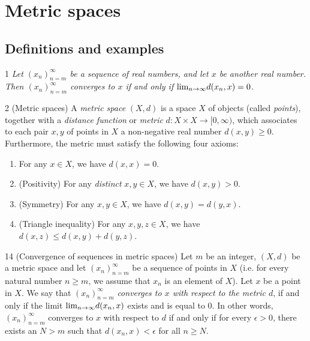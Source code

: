 \section{Metric spaces}\label{a2-ch1}
\subsection{Definitions and examples}
\begin{lemma}{1}
    \label{real-convergence-via-distance}
    \emph{Let $(x_n)_{n=m}^{\infty}$ be a sequence of real numbers, and let $x$
    be another real number. Then $(x_n)_{n=m}^{\infty}$ converges to $x$ if and
    only if $\text{lim}_{n \rightarrow \infty}{d(x_n, x)} = 0$.}
\end{lemma}

\begin{definition}{2}
    \label{metric-space}
    (Metric spaces) A \emph{metric space} $(X, d)$ is a space $X$ of objects
    (called \emph{points}), together with a \emph{distance function} or \emph{metric}
    $d: X \times X \rightarrow [0, \infty)$, which associates to each pair $x, y$
    of points in $X$ a non-negative real number $d(x, y) \geq 0$. Furthermore, the
    metric must satisfy the following four axioms:
    \begin{enumerate}
        \item For any $x \in X$, we have $d(x, x) = 0$.
        \item (Positivity) For any \emph{distinct} $x, y \in X$, we have $d(x, y) > 0$.
        \item (Symmetry) For any $x, y \in X$, we have $d(x, y) = d(y, x)$.
        \item (Triangle inequality) For any $x, y, z \in X$, we have $d(x, z) \leq d(x, y) + d(y, z)$.
    \end{enumerate}
\end{definition}

\begin{definition}{14}
    \label{metric-convergence}
    (Convergence of sequences in metric spaces) Let $m$ be an integer, $(X, d)$
    be a metric space and let $(x_n)_{n=m}^{\infty}$ be a sequence of points in $X$
    (i.e. for every natural number $n \geq m$, we assume that $x_n$ is an element
    of $X$). Let $x$ be a point in $X$. We say that $(x_n)_{n=m}^{\infty}$ \emph{converges
    to $x$ with respect to the metric $d$}, if and only if the limit $\text{lim}_{n \rightarrow \infty}{d(x_n, x)}$
    exists and is equal to 0. In other words, $(x_n)_{n=m}^{\infty}$ converges to $x$
    with respect to $d$ if and only if for every $\epsilon > 0$, there exists an
    $N > m$ such that $d(x_n, x) < \epsilon$ for all $n \geq N$.
\end{definition}

